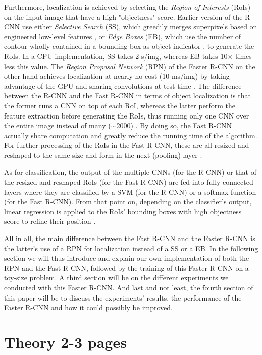 \documentclass[a4paper]{article}
\begin{document}
Furthermore, localization is achieved by selecting the \emph{Region of Interests} (RoIs) on the input image that have a high "objectness" score. Earlier version of the R-CNN use either \emph{Selective Search} (SS), which greedily merges superpixels based on engineered low-level features \cite{ss}, or \emph{Edge Boxes} (EB), which use the number of contour wholly contained in a bounding box as object indicator \cite{eb}, to generate the RoIs. In a CPU implementation, SS takes 2 s/img, whereas EB takes 10$\times$ times less this value. The \emph{Region Proposal Network} (RPN) of the Faster R-CNN on the other hand achieves localization at nearly no cost (10 ms/img) by taking advantage of the GPU and sharing convolutions at test-time \cite{fasterrcnn}. The difference between the R-CNN and the Fast R-CNN in terms of object localization is that the former runs a CNN on top of each RoI, whereas the latter perform the feature extraction before generating the RoIs, thus running only one CNN over the entire image instead of many ($\sim$2000) \cite{fastrcnn}. By doing so, the Fast R-CNN actually share computation and greatly reduce the running time of the algorithm. For further processing of the RoIs in the Fast R-CNN, these are all resized and reshaped to the same size and form in the next (pooling) layer \cite{fastrcnn}.

As for classification, the output of the multiple CNNs (for the R-CNN) or that of the resized and reshaped RoIs (for the Fast R-CNN) are fed into fully connected layers where they are classified by a SVM (for the R-CNN) or a softmax function (for the Fast R-CNN). From that point on, depending on the classifier's output, linear regression is applied to the RoIs' bounding boxes with high objectness score to refine their position \cite{fastrcnn}.

All in all, the main difference between the Fast R-CNN and the Faster R-CNN is the latter's use of a RPN for localization instead of a SS or a EB. In the following section we will thus introduce and explain our own implementation of both the RPN and the Fast R-CNN, followed by the training of this Faster R-CNN on a toy-size problem. A third section will be on the different experiments we conducted with this Faster R-CNN. And last and not least, the fourth section of this paper will be to discuss the experiments' results, the performance of the Faster R-CNN and how it could possibly be improved.

\section{Theory 2-3 pages}
\label{sec:theory}
\end{document}
